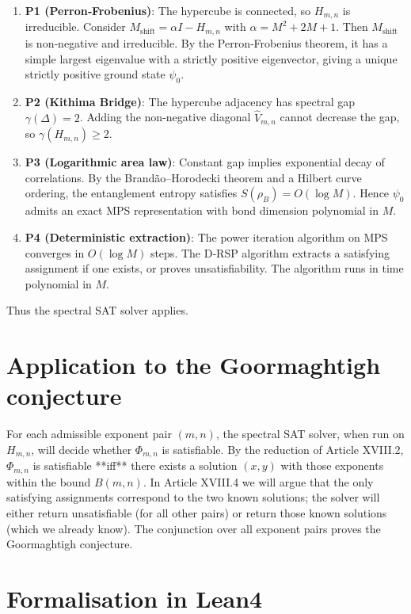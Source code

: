 \documentclass[11pt,a4paper]{article}
\begin{document}
\begin{enumerate}
\item \textbf{P1 (Perron‑Frobenius)}: The hypercube is connected, so \(H_{m,n}\) is irreducible. Consider \(M_{\text{shift}} = \alpha I - H_{m,n}\) with \(\alpha = M^2 + 2M + 1\). Then \(M_{\text{shift}}\) is non‑negative and irreducible. By the Perron‑Frobenius theorem, it has a simple largest eigenvalue with a strictly positive eigenvector, giving a unique strictly positive ground state \(\psi_0\).
\item \textbf{P2 (Kithima Bridge)}: The hypercube adjacency has spectral gap \(\gamma(\Delta)=2\). Adding the non‑negative diagonal \(\hat{V}_{m,n}\) cannot decrease the gap, so \(\gamma(H_{m,n}) \ge 2\).
\item \textbf{P3 (Logarithmic area law)}: Constant gap implies exponential decay of correlations. By the Brandão–Horodecki theorem and a Hilbert curve ordering, the entanglement entropy satisfies \(S(\rho_B)=O(\log M)\). Hence \(\psi_0\) admits an exact MPS representation with bond dimension polynomial in \(M\).
\item \textbf{P4 (Deterministic extraction)}: The power iteration algorithm on MPS converges in \(O(\log M)\) steps. The D‑RSP algorithm extracts a satisfying assignment if one exists, or proves unsatisfiability. The algorithm runs in time polynomial in \(M\).
\end{enumerate}

Thus the spectral SAT solver applies.

\section{Application to the Goormaghtigh conjecture}

For each admissible exponent pair \((m,n)\), the spectral SAT solver, when run on \(H_{m,n}\), will decide whether \(\Phi_{m,n}\) is satisfiable. By the reduction of Article XVIII.2, \(\Phi_{m,n}\) is satisfiable **iff** there exists a solution \((x,y)\) with those exponents within the bound \(B(m,n)\). In Article XVIII.4 we will argue that the only satisfying assignments correspond to the two known solutions; the solver will either return unsatisfiable (for all other pairs) or return those known solutions (which we already know). The conjunction over all exponent pairs proves the Goormaghtigh conjecture.

\section{Formalisation in Lean4}
\end{document}

